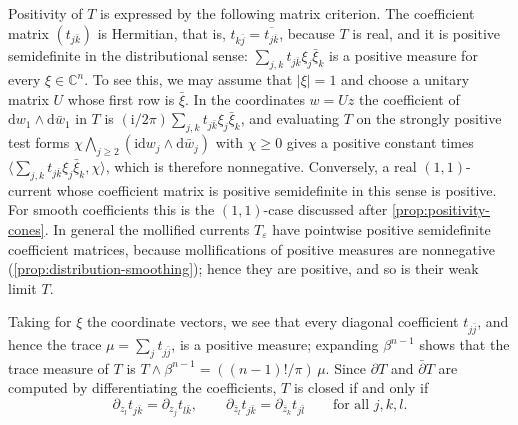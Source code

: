Positivity of $T$ is expressed by the following matrix criterion. The coefficient matrix $(t_{j\bar k})$ is Hermitian, that is, $t_{k\bar j}=\overline{t_{j\bar k}}$, because $T$ is real, and it is positive semidefinite in the distributional sense: $\sum_{j,k}t_{j\bar k}\xi_j\bar\xi_k$ is a positive measure for every $\xi\in\mathbb C^n$. To see this, we may assume that $|\xi|=1$ and choose a unitary matrix $U$ whose first row is $\bar\xi$. In the coordinates $w=Uz$ the coefficient of $\mathrm dw_1\wedge\mathrm d\bar w_1$ in $T$ is $(\mathrm i/2\pi)\sum_{j,k}t_{j\bar k}\xi_j\bar\xi_k$, and evaluating $T$ on the strongly positive test forms $\chi\bigwedge_{j\geq2}(\mathrm i\mathrm dw_j\wedge\mathrm d\bar w_j)$ with $\chi\geq0$ gives a positive constant times $\langle\sum_{j,k}t_{j\bar k}\xi_j\bar\xi_k,\chi\rangle$, which is therefore nonnegative. Conversely, a real $(1,1)$-current whose coefficient matrix is positive semidefinite in this sense is positive. For smooth coefficients this is the $(1,1)$-case discussed after \cref{prop:positivity-cones}. In general the mollified currents $T_\varepsilon$ have pointwise positive semidefinite coefficient matrices, because mollifications of positive measures are nonnegative (\cref{prop:distribution-smoothing}); hence they are positive, and so is their weak limit $T$.

Taking for $\xi$ the coordinate vectors, we see that every diagonal coefficient $t_{j\bar j}$, and hence the trace $\mu=\sum_jt_{j\bar j}$, is a positive measure; expanding $\beta^{n-1}$ shows that the trace measure of $T$ is $T\wedge\beta^{n-1}=((n-1)!/\pi)\,\mu$. Since $\partial T$ and $\bar\partial T$ are computed by differentiating the coefficients, $T$ is closed if and only if
\begin{equation}\label{eq:closed-hessian-coefficients}
 \partial_{z_l}t_{j\bar k}=\partial_{z_j}t_{l\bar k},\qquad
 \partial_{\bar z_l}t_{j\bar k}=\partial_{\bar z_k}t_{j\bar l}
 \qquad\text{for all }j,k,l.
\end{equation}

